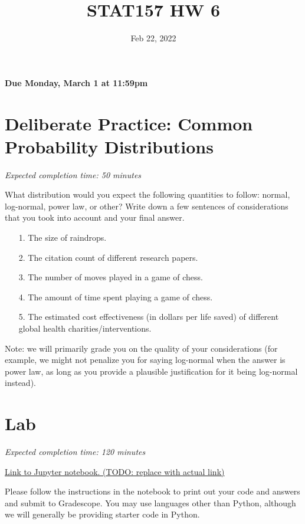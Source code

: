 \documentclass[11pt]{article}
\title{STAT157 HW 6}
\date{Feb 22, 2022}
\begin{document}
\maketitle

\hfill \textbf{Due Monday, March 1 at 11:59pm}

\section*{Deliberate Practice: Common Probability Distributions}

\emph{Expected completion time: 50 minutes}

What distribution would you expect the following quantities to follow: normal, log-normal, power law, or other? Write down a few sentences of considerations that you took into account and your final answer. 

\begin{enumerate}
	\item[1.] The size of raindrops.
	\item[2.] The citation count of different research papers.
	\item[3.] The number of moves played in a game of chess.
	\item[4.] The amount of time spent playing a game of chess.
	\item[5.] The estimated cost effectiveness (in dollars per life saved) of different global health charities/interventions.
\end{enumerate}

Note: we will primarily grade you on the quality of your considerations (for example, we might not penalize you for saying log-normal when the answer is power law, as long as you provide a plausible justification for it being log-normal instead).

\section*{Lab}

\emph{Expected completion time: 120 minutes}

\href{https://datahub.berkeley.edu/hub/user-redirect/git-pull?repo=https%3A%2F%2Fgithub.com%2[…]stat-157-260-website%2Fhw%2Fhw4%2Fhw4lab.ipynb&branch=main}{Link to Jupyter notebook. (TODO: replace with actual link)}

Please follow the instructions in the notebook to print out your code and answers and submit to Gradescope. You may use languages other than Python, although we will generally be providing starter code in Python.
\end{document}
